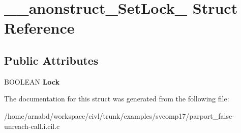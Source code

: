 \hypertarget{struct____anonstruct__SetLock__75}{}\section{\+\_\+\+\_\+anonstruct\+\_\+\+Set\+Lock\+\_ Struct Reference}
\label{struct____anonstruct__SetLock__75}
\subsection*{Public Attributes}
\begin{DoxyCompactItemize}
\item 
\hypertarget{struct____anonstruct__SetLock__75_a039ebdee68be1a39c5c5b706d52cb6b0}{}B\+O\+O\+L\+E\+A\+N {\bfseries Lock}\label{struct____anonstruct__SetLock__75_a039ebdee68be1a39c5c5b706d52cb6b0}

\end{DoxyCompactItemize}


The documentation for this struct was generated from the following file\+:\begin{DoxyCompactItemize}
\item 
/home/arnabd/workspace/civl/trunk/examples/svcomp17/parport\+\_\+false-\/unreach-\/call.\+i.\+cil.\+c\end{DoxyCompactItemize}
